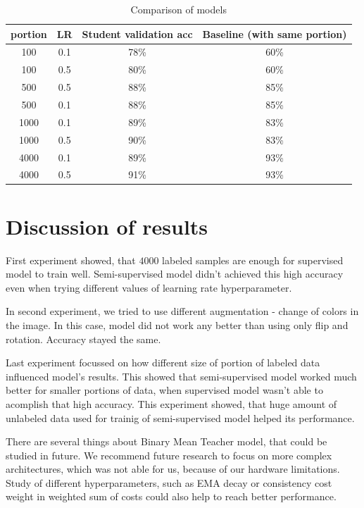 \begin{table}[h]
    \centering
    \begin{tabular}{ |c|c|c|c|} 
     \hline

     portion & LR & Student validation acc & Baseline (with same portion)\\
     \hline
     
     100 & 0.1 & \color{purple}  78\%   &  60\% \\ 
     100 & 0.5 & \color{purple} 80\%  & 60\% \\
     500 & 0.5 & \color{purple} 88\% &  85\% \\
     500 & 0.1 & \color{purple} 88\% &  85\% \\
     1000 & 0.1 & \color{purple}89\% &  83\% \\
     1000 & 0.5 & \color{purple}90\% &  83\%  \\
     4000 & 0.1 & 89\% & 93\% \\
     4000 & 0.5 & 91\% & 93\%  \\
     
     \hline
    \end{tabular}
    \caption{Comparison of models}
    \label{portions}
\end{table}


\section{Discussion of results} 
First experiment showed, that $4000$ labeled samples are enough for supervised model to train well. Semi-supervised model didn't achieved this high accuracy  even when trying different values of learning rate hyperparameter.

In second experiment, we tried to use different augmentation - change of colors in the image. In this case, model did not work any better than using only flip and rotation. Accuracy stayed the same.


Last experiment focussed on how different size of portion of labeled data influenced model's results. This showed that semi-supervised model worked much better for smaller portions of data, when supervised model wasn't able to acomplish that high accuracy. This experiment showed, that huge amount of unlabeled data used for trainig of semi-supervised model helped its performance.

There are several things about Binary Mean Teacher model, that could be studied in future. We recommend future research to focus on more complex architectures, which was not able for us, because of our hardware limitations. Study of different hyperparameters, such as EMA decay or consistency cost weight in weighted sum of costs could also help to reach better performance.


